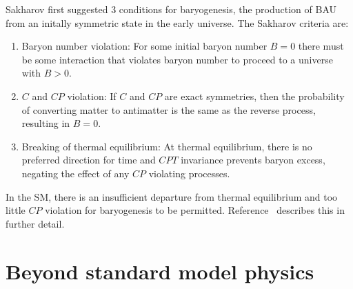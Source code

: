 Sakharov \cite{Sakharov_1991} first suggested 3 conditions for baryogenesis, the production of BAU from an initally symmetric state in the early universe. The Sakharov criteria are:
%
\begin{enumerate}
    \item Baryon number violation: For some initial baryon number $B=0$ there must be some interaction that violates baryon number to proceed to a universe with $B>0$.
    \item $C$ and $CP$ violation: If $C$ and $CP$ are exact symmetries, then the probability of converting matter to antimatter is the same as the reverse process, resulting in $B=0$.
    \item Breaking of thermal equilibrium:  At thermal equilibrium, there is no preferred direction for time and $CPT$ invariance prevents baryon excess, negating the effect of any $CP$ violating processes.
\end{enumerate}

In the SM, there is an insufficient departure from thermal equilibrium and too little $CP$ violation for baryogenesis to be permitted. Reference~\cite{Dubbers2011} describes this in further detail.


\section{Beyond standard model physics}


